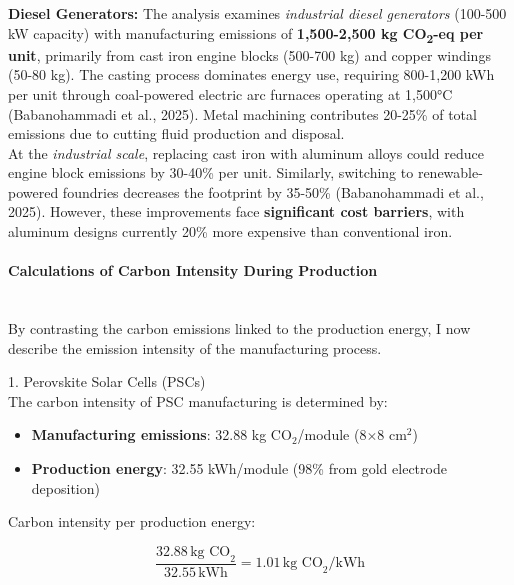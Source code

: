 \documentclass{article}
\newcommand{\wm}[2]{%
	\begin{minipage}{#1\textwidth}
		\centering
		#2
	\end{minipage}%
}
\begin{document}
\begin{tcolorbox}[title={\subsubsection{Manufacturing Phase}\vspace{-1em}}, colback=white, colframe=green!50!black, boxrule=0.4mm, width=1\textwidth]
\textcolor{green!50!black}{\textbf{Diesel Generators:}}
The analysis examines \textit{industrial diesel generators} (100-500 kW capacity) with manufacturing emissions of \textbf{1,500-2,500 kg CO\textsubscript{2}-eq per unit}, primarily from cast iron engine blocks (500-700 kg) and copper windings (50-80 kg). The casting process dominates energy use, requiring 800-1,200 kWh per unit through coal-powered electric arc furnaces operating at 1,500°C (Babanohammadi et al., 2025). Metal machining contributes 20-25\% of total emissions due to cutting fluid production and disposal. \\[8pt]
At the \textit{industrial scale}, replacing cast iron with aluminum alloys could reduce engine block emissions by 30-40\% per unit. Similarly, switching to renewable-powered foundries decreases the footprint by 35-50\% (Babanohammadi et al., 2025). However, these improvements face \textbf{significant cost barriers}, with aluminum designs currently 20\% more expensive than conventional iron.
\end{tcolorbox}
\paragraph{Calculations of Carbon Intensity During Production}\mbox{}\\[6pt]
By contrasting the {carbon emissions} linked to the {production energy}, I now describe the {emission intensity of the manufacturing process}.\\

\vspace*{1em}


\begin{minipage}{0.55\textwidth}
\Large
{1. Perovskite Solar Cells (PSCs)}\\[8pt]
\normalsize
The carbon intensity of PSC manufacturing is determined by:\\[-4pt]
\begin{itemize}[itemsep=2mm]
	\item \textbf{Manufacturing emissions}: 32.88 kg CO$_2$/module (8$\times$8 cm$^2$)
	\item \textbf{Production energy}: 32.55 kWh/module (98\% from gold electrode deposition)
\end{itemize}
\end{minipage}\hfil
\begin{minipage}{0.5\textwidth}\centering
\hspace{-1em}\wm{1}{Carbon intensity per production energy:}
\[\frac{32.88\,\text{kg CO}_2}{32.55\,\text{kWh}} = {1.01\,\text{kg CO}_2/\text{kWh}}\]
\end{minipage}\\
\end{document}

